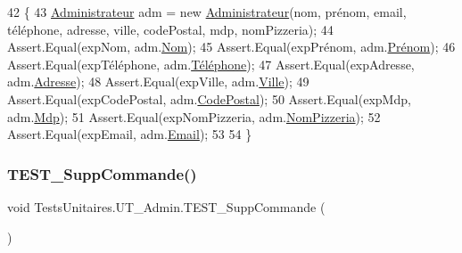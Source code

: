 \begin{DoxyCode}
42         \{
43             \hyperlink{classModele_1_1Administrateur}{Administrateur} adm = \textcolor{keyword}{new} \hyperlink{classModele_1_1Administrateur}{Administrateur}(nom, prénom, email, 
      téléphone, adresse, ville, codePostal, mdp, nomPizzeria);
44             Assert.Equal(expNom, adm.\hyperlink{classModele_1_1Utilisateur_a2aa56cab9101d6c24445d3d6e1a7640d}{Nom});
45             Assert.Equal(expPrénom, adm.\hyperlink{classModele_1_1Utilisateur_a8be63c78df8f6d3bbeb8f6ceb7197975}{Prénom});
46             Assert.Equal(expTéléphone, adm.\hyperlink{classModele_1_1Utilisateur_ac0addebdc1b4733d0b0447f6a22b81c9}{Téléphone});
47             Assert.Equal(expAdresse, adm.\hyperlink{classModele_1_1Utilisateur_ad757f35a1187212cec5bb285e5a0e0ca}{Adresse});
48             Assert.Equal(expVille, adm.\hyperlink{classModele_1_1Utilisateur_add873e1f9c9c49bc1ab75d4850a41aa8}{Ville});
49             Assert.Equal(expCodePostal, adm.\hyperlink{classModele_1_1Utilisateur_a5f92f22eba78e5b4cccccc1936351886}{CodePostal});
50             Assert.Equal(expMdp, adm.\hyperlink{classModele_1_1Utilisateur_a6da26e59e09412a036824cf27dac6976}{Mdp});
51             Assert.Equal(expNomPizzeria, adm.\hyperlink{classModele_1_1Administrateur_addbed2fd93cf904a6703d8debd758313}{NomPizzeria});
52             Assert.Equal(expEmail, adm.\hyperlink{classModele_1_1Utilisateur_a1250bfe957225a47f96f31e5d0c1d305}{Email});
53 
54         \}
\end{DoxyCode}
\mbox{\label{classTestsUnitaires_1_1UT__Admin_aa22f22b624760467abb5fd441c1ece3e}} 
\subsubsection{\texorpdfstring{T\+E\+S\+T\+\_\+\+Supp\+Commande()}{TEST\_SuppCommande()}}
{\footnotesize\ttfamily void Tests\+Unitaires.\+U\+T\+\_\+\+Admin.\+T\+E\+S\+T\+\_\+\+Supp\+Commande (\begin{DoxyParamCaption}{ }\end{DoxyParamCaption})\hspace{0.3cm}{\ttfamily [inline]}}


